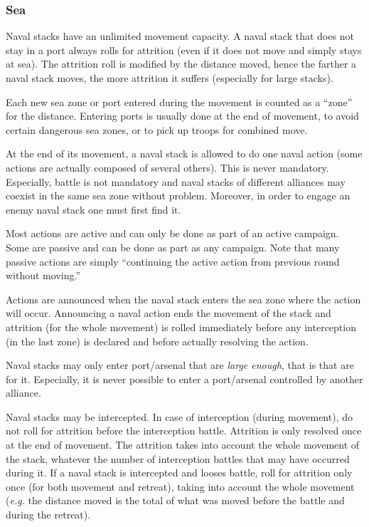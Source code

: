 \subsubsection{Sea}
Naval stacks have an unlimited movement capacity. A naval stack that does not
stay in a port always rolls for attrition (even if it does not move and simply
stays at sea). The attrition roll is modified by the distance moved, hence the
farther a naval stack moves, the more attrition it suffers (especially for
large stacks).

Each new sea zone or port entered during the movement is counted as a ``zone''
for the distance. Entering ports is usually done at the end of movement, to
avoid certain dangerous sea zones, or to pick up troops for combined move.

At the end of its movement, a naval stack is allowed to do one naval action
(some actions are actually composed of several others). This is never
mandatory. Especially, battle is not mandatory and naval stacks of different
alliances may coexist in the same sea zone without problem. Moreover, in order
to engage an enemy naval stack one must first find it.

Most actions are active and can only be done as part of an active
campaign. Some are passive and can be done as part as any campaign. Note that
many passive actions are simply ``continuing the active action from previous
round without moving.''

Actions are announced when the naval stack enters the sea zone where the
action will occur. Announcing a naval action ends the movement of the stack
and attrition (for the whole movement) is rolled immediately before any
interception (in the last zone) is declared and before actually resolving the
action.

Naval stacks may only enter port/arsenal that are \emph{large enough}, that is
that are \SoS for it. Especially, it is never possible to enter a port/arsenal
controlled by another alliance.

Naval stacks may be intercepted. In case of interception (during movement), do
not roll for attrition before the interception battle. Attrition is only
resolved once at the end of movement. The attrition takes into account the
whole movement of the stack, whatever the number of interception battles that
may have occurred during it. If a naval stack is intercepted and looses
battle, roll for attrition only once (for both movement and retreat), taking
into account the whole movement (\emph{e.g.} the distance moved is the total
of what was moved before the battle and during the retreat).

